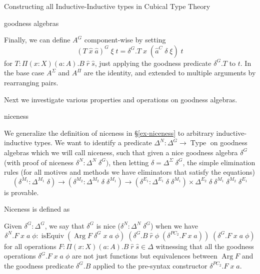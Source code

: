 \documentclass[runningheads]{llncs}
\DeclareMathOperator{\USet}{Type}
\DeclareMathOperator{\isEquiv}{isEquiv}
\DeclareMathOperator{\Arg}{Arg}
\begin{document}
{\begin{section}{Constructing all Inductive-Inductive types in Cubical Type Theory}
\begin{subsection}{goodness algebras}
\begin{definition}
Finally, we can define $A^G$ component-wise by setting \[(T\;\hat{x}\;\hat{a})^G\;\xi\;t = \delta^G.T\;\hat{x}\;(\hat{a}^C\;\delta\;\xi)\;t\] for $T : \Pi(x : X)(a : A).B\;\hat{r}\;\hat{s}$, just applying the goodness predicate $\delta^G.T$ to $t$. In the base case $A^\Sigma$ and $A^\Pi$ are the identity, and extended to multiple arguments by rearranging pairs.

\end{definition}

Next we investigate various properties and operations on goodness algebras.

\end{subsection}
\begin{subsection}{niceness}\label{niceness}

We generalize the definition of niceness in \S\ref{ex-niceness} to arbitrary inductive-inductive types.
We want to identify a predicate $\Delta^N : \Delta^G \to \USet$ on goodness algebras which we will call niceness, such that given a nice goodness algebra $\delta^G$ (with proof of niceness $\delta^N : \Delta^N\;\delta^G)$, then letting $\delta = \Delta^\Sigma\;\delta^G$, the simple elimination rules (for all motives and methods we have eliminators that satisfy the equations)
\[(\delta^{M_1} : \Delta^{M_1}\;\delta) \to (\delta^{M_2} : \Delta^{M_2}\;\delta\;\delta^{M_1}) \to (\delta^{E_1} : \Delta^{E_1}\;\delta\;\delta^{M_1}) \times \Delta^{E_2}\;\delta\;\delta^{M_1}\;\delta^{M_2}\;\delta^{E_1}\] is provable.

Niceness is defined as
\begin{definition}
Given $\delta^G : \Delta^G$, we say that $\delta^G$ is nice ($\delta^N : \Delta^N\;\delta^G$) when we have \[\delta^N.F\;x\;a\;\phi : \isEquiv  (\Arg F\;\delta^G\;x\;a\;\phi)\;(\delta^G.B\;\hat{r}\;\phi\;(\delta^{PC_2}.F\;x\;a))\;(\delta^G.F\;x\;a\;\phi)\] for all operations $F : \Pi(x : X)(a : A).B\;\hat{r}\;\hat{s}\in\Delta$ witnessing that all the goodness operations $\delta^G.F\;x\;a\;\phi$ are not just functions but equivalences between $\Arg F$ and the goodness predicate $\delta^G.B$ applied to the pre-syntax constructor $\delta^{PC_2}.F\;x\;a$.
\end{definition}


\end{subsection}
\end{section}}
\end{document}
